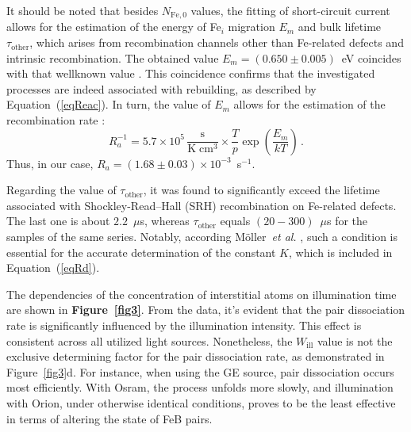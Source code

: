 \documentclass{WileyMSP-template}
\begin{document}
It should be noted that besides $N_\mathrm{Fe,0}$ values,
the fitting of short-circuit current \cite{Olikh2022:JMatSci,Olikh2021JAP} allows for the estimation of the energy of Fe$_i$ migration $E_m$
and bulk lifetime $\tau_\mathrm{other}$, which arises from recombination channels other than Fe-related defects and intrinsic recombination.
The obtained value $E_m=(0.650\pm0.005)$~eV coincides with that wellknown value \cite{FeBKin2019,FeBAssSST2011,FeBkinAPL2008}.
This coincidence confirms that the investigated processes are indeed associated with rebuilding,
as described by Equation~(\ref{eqReac}).
In turn, the value of $E_m$ allows for the estimation of the recombination rate \cite{FeBAssJAP2014,FeBKin2019,FeBAssSST2011}:
\begin{equation}
\label{eqTass}
R_a^{-1}=5.7\times10^5\,\frac{\mathrm{s}}{\mathrm{K}\;\mathrm{cm}^3}\times\frac{T}{p}\exp\left(\frac{E_m}{kT}\right)\,.
\end{equation}
Thus, in our case, $R_a=(1.68\pm0.03)\times10^{-3}$~s$^{-1}$.

Regarding the value of $\tau_\mathrm{other}$, it was found to significantly exceed the
lifetime associated with Shockley-Read–Hall (SRH) recombination on Fe-related defects.
The last one is about $2.2$~$\mu$s, whereas $\tau_\mathrm{other}$ equals $(20-300)$~$\mu$s for the samples of the same series.
Notably, according M\"{o}ller~\emph{et al.} \cite{FeBAssJAP2014},
such a condition is essential for the accurate determination of the constant $K$, which is included in Equation~(\ref{eqRd}).


The dependencies of the concentration of interstitial atoms on illumination time are shown in \textbf{Figure~\ref{fig3}}.
From the data, it's evident that the pair dissociation rate is significantly influenced by the illumination intensity.
This effect is consistent across all utilized light sources.
Nonetheless, the $W_\mathrm{ill}$ value is not the exclusive determining factor for the pair dissociation rate,
as demonstrated in Figure~\ref{fig3}d.
For instance, when using the GE source, pair dissociation occurs most efficiently.
With Osram, the process unfolds more slowly,
and illumination with Orion, under otherwise identical conditions, proves to be the least effective in terms of altering the state of FeB pairs.
\end{document}
